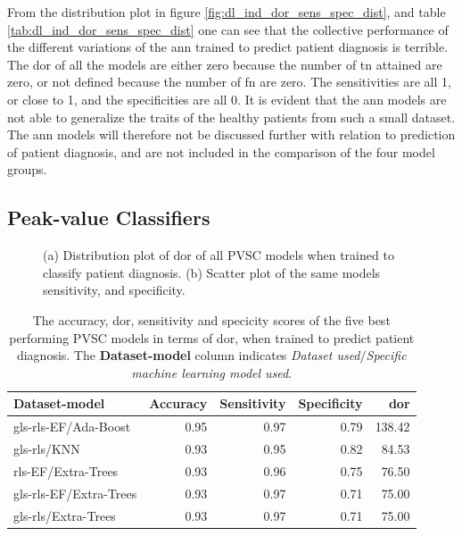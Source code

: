 From the distribution plot in figure \ref{fig:dl_ind_dor_sens_spec_dist}, and table \ref{tab:dl_ind_dor_sens_spec_dist} one can see that the collective performance of the different variations of the \acrshort{ann} trained to predict patient diagnosis is terrible. The \acrshort{dor} of all the models are either zero because the number of \acrshort{tn} attained are zero, or not defined because the number of \acrshort{fn} are zero. The sensitivities are all 1, or close to 1, and the specificities are all 0. It is evident that the \acrshort{ann} models are not able to generalize the traits of the healthy patients from such a small dataset. The \acrshort{ann} models will therefore not be discussed further with relation to prediction of patient diagnosis, and are not included in the comparison of the four model groups.

\newpage

\subsection{Peak-value Classifiers}

\begin{figure}[H]
    \centering
    
    \caption{(a) Distribution plot of \acrshort{dor} of all PVSC models when trained to classify patient diagnosis.
             (b) Scatter plot of the same models sensitivity, and specificity.}
    \label{fig:pvmlc_ind_dor_sens_spec_dist}
\end{figure}

\begin{table}
    \centering
    \begin{tabular}{lrrrr}
        \toprule
        Dataset-model          &  Accuracy &  Sensitivity &  Specificity &  \acrshort{dor} \\
        \midrule
        gls-rls-EF/Ada-Boost   &      0.95 &         0.97 &         0.79 & 138.42 \\
        gls-rls/KNN            &      0.93 &         0.95 &         0.82 &  84.53 \\
        rls-EF/Extra-Trees     &      0.93 &         0.96 &         0.75 &  76.50 \\
        gls-rls-EF/Extra-Trees &      0.93 &         0.97 &         0.71 &  75.00 \\
        gls-rls/Extra-Trees    &      0.93 &         0.97 &         0.71 &  75.00 \\
        \bottomrule
    \end{tabular}
    \caption{The accuracy, \acrshort{dor}, sensitivity and specicity scores of the five best performing PVSC models in terms of \acrshort{dor}, when trained to predict patient diagnosis.
             The \textbf{Dataset-model} column indicates \textit{Dataset used}$/$\textit{Specific machine learning model used}.}
    \label{tab:pvsc_hf_dor_sens_spec_dist}
\end{table}


